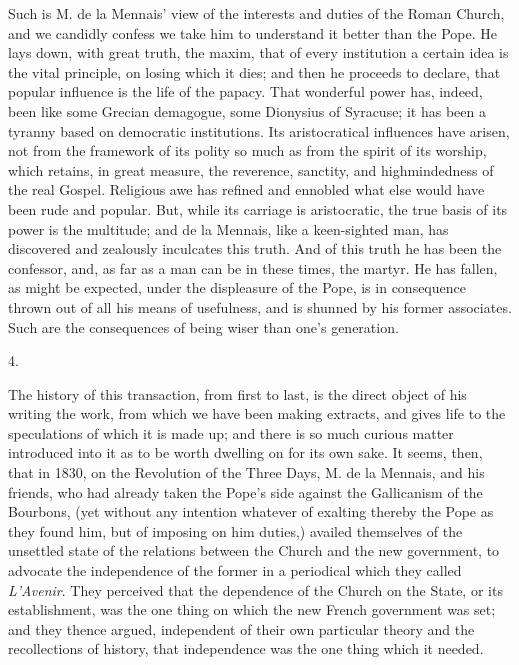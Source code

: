 Such is M. de la Mennais' view of the interests
and duties of the Roman Church, and we candidly confess we take him to
understand it better than the Pope. He lays down, with great truth,
the maxim, that of every institution a certain idea is the vital
principle, on losing which it dies; and then he proceeds to declare,
that popular influence is the life of the papacy. That wonderful power
has, indeed, been like some Grecian demagogue, some Dionysius of
Syracuse; it has been a tyranny based on democratic institutions. Its
aristocratical influences have arisen, not from the framework of its
polity so much as from the spirit of its worship, which retains, in
great measure, the reverence, sanctity, and highmindedness of the real
Gospel. Religious awe has refined and ennobled what else would have
been rude and popular. But, while its carriage is aristocratic, the
true basis of its power is the multitude; and de la Mennais, like a
keen-sighted man, has discovered and zealously inculcates this truth.
And of this truth he has been the confessor, and, as far as a man can
be in these times, the martyr. He has fallen, as might be expected,
under the displeasure of the Pope, is in consequence thrown out of all
his means of usefulness, and is shunned by his former associates. Such
are the consequences of being wiser than one's generation.

4.

The history of this transaction, from first to
last, is the direct object of his writing the work, from which we have
been making extracts, and gives life to the speculations of which it
is made up; and there is so much curious matter introduced into it as
to be worth dwelling on for its own sake. It seems, then, that in
1830, on the Revolution of the Three Days, M. de la Mennais, and his
friends, who had already taken the Pope's side against the Gallicanism
of the Bourbons, (yet without any intention whatever of exalting
thereby the Pope as they found him, but of imposing on him duties,)
availed themselves of the unsettled state of the relations between the
Church and the new government, to advocate the independence of the
former in a periodical which they called \emph{L'Avenir}. They
perceived that the dependence of the Church on the State, or its
establishment, was the one thing on which the new French government
was set; and they thence argued, independent of their own particular
theory and the recollections of history, that independence was the one
thing which it needed.

